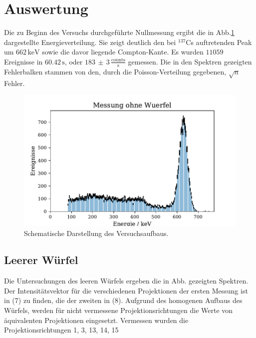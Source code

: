 \section{Auswertung}
Die zu Beginn des Versuchs durchgeführte Nullmessung ergibt die in Abb.\ref{Leermessung} dargestellte Energieverteilung. Sie zeigt deutlich den bei $^{137}$Cs auftretenden Peak um $662 \, \si{\kilo\electronvolt}$ sowie die davor liegende
Compton-Kante. Es wurden $11059$ Ereignisse in $60.42 \, \si{\second}$, oder $183 \,  \pm \, 3\, \frac{\text{counts}}{\si{\second}}$ gemessen.
Die in den Spektren gezeigten Fehlerbalken stammen von den, durch die Poisson-Verteilung gegebenen, $\sqrt{n}$ Fehler.
\begin{figure}[H]
  \centering
  \includegraphics{plots/leer.pdf}
  \caption{Schematische Darstellung des Versuchsaufbaus.\cite{anleitung}}
  \label{Leermessung}
\end{figure}
\subsection{Leerer Würfel}
Die Untersuchungen des leeren Würfels ergeben die in Abb. gezeigten Spektren. Der Intensitätsvektor
für die verschiedenen Projektionen der ersten Messung ist in (7) zu finden, die der zweiten in (8).
Aufgrund des homogenen Aufbaus des Würfels,
werden für nicht vermessene Projektionsrichtungen die Werte von äquivalenten Projektionen eingesetzt.
Vermessen wurden die Projektionsrichtungen 1, 3, 13, 14, 15

